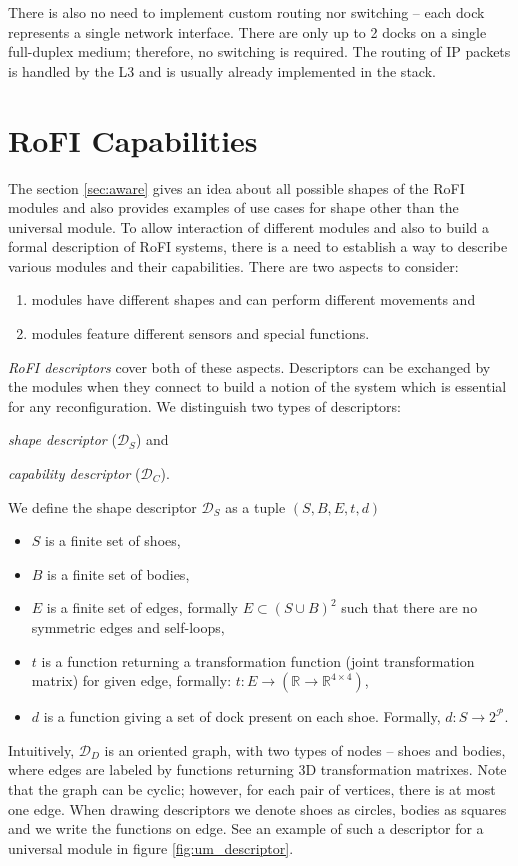 There is also no need to implement custom routing nor switching -- each dock
represents a single network interface. There are only up to 2 docks on a single
full-duplex medium; therefore, no switching is required. The routing of IP
packets is handled by the L3 and is usually already implemented in the stack.


\section{RoFI Capabilities}\label{sec:capabilities}

The section \ref{sec:aware} gives an idea about all possible shapes of the RoFI
modules and also provides examples of use cases for shape other than the
universal module. To allow interaction of different modules and also to build
a formal description of RoFI systems, there is a need to establish a way to
describe various modules and their capabilities. There are two aspects to
consider:
\begin{enumerate}
    \item modules have different shapes and can perform different movements and
    \item modules feature different sensors and special functions.
\end{enumerate}

\emph{RoFI descriptors} cover both of these aspects. Descriptors can be
exchanged by the modules when they connect to build a notion of the system which
is essential for any reconfiguration. We distinguish two types of descriptors:
\begin{enumerate*}
    \item \emph{shape descriptor} ($\mathcal{D}_S$) and
    \item \emph{capability descriptor} ($\mathcal{D}_C$).
\end{enumerate*}

We define the shape descriptor $\mathcal{D}_S$ as a tuple $(S, B, E, t, d)$
\begin{itemize}
    \item $S$ is a finite set of shoes,
    \item $B$ is a finite set of bodies,
    \item $E$ is a finite set of edges, formally $E \subset (S\cup B)^2$ such
    that there are no symmetric edges and self-loops,
    \item $t$ is a function returning a transformation function (joint
    transformation matrix) for given edge, formally: $t:
    E\rightarrow(\mathds{R}\rightarrow\mathds{R}^{4\times4})$,
    \item $d$ is a function giving a set of dock present on each shoe. Formally,
    $d: S\rightarrow 2^\mathcal{P}$.
\end{itemize}
Intuitively, $\mathcal{D}_D$ is an oriented graph, with two types of nodes --
shoes and bodies, where edges are labeled by functions returning 3D
transformation matrixes. Note that the graph can be cyclic; however, for each
pair of vertices, there is at most one edge. When drawing descriptors we denote
shoes as circles, bodies as squares and we write the functions on edge. See
an example of such a descriptor for a universal module in figure
\ref{fig:um_descriptor}.

